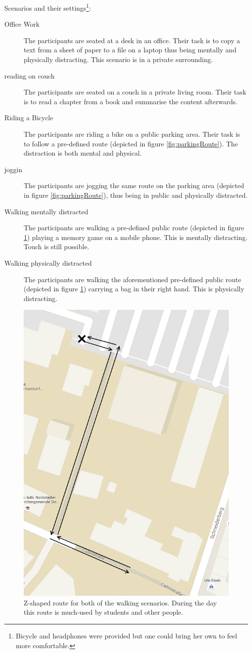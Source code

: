 Scenarios and their settings\footnote{Bicycle and headphones were provided but one could bring her own to feel more comfortable.}:
\begin{description}
	\item[Office Work]{The participants are seated at a desk in an office. Their task is to copy a text from a sheet of paper to a file on a laptop thus being mentally and physically distracting. This scenario is in a private surrounding.}
	\item[reading on couch]{The participants are seated on a couch in a private living room. Their task is to read a chapter from a book and summarise the content afterwards.}
	\item[Riding a Bicycle]{The participants are riding a bike on a public parking area. Their task is to follow a pre-defined route (depicted in figure \ref{fig:parkingRoute}). The distraction is both mental and physical.}
	\item[joggin]{The participants are jogging the same route on the parking area (depicted in figure \ref{fig:parkingRoute}), thus being in public and physically distracted.}
	\item[Walking mentally distracted]{The participants are walking a pre-defined public route (depicted in figure \ref{fig:walkingRoute}) playing a memory game on a mobile phone. This is mentally distracting. Touch is still possible.}
	\item[Walking physically distracted]{The participants are walking the aforementioned pre-defined public route (depicted in figure \ref{fig:walkingRoute}) carrying a bag in their right hand. This is physically distracting.}
\end{description}

\begin{figure}[bth]
	\myfloatalign
	\includegraphics[width=.7\linewidth]{img/walkingRoute.png}
	\caption{Z-shaped route for both of the walking scenarios. During the day this route is much-used by students and other people.}
	\label{fig:walkingRoute}
\end{figure}


